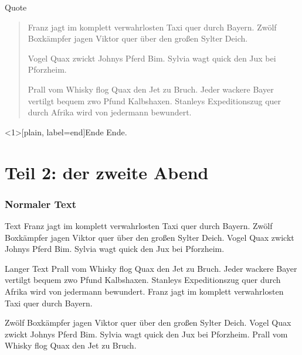 	\begin{frame}{Quote}
		\begin{quote}
			Franz jagt im komplett verwahrlosten Taxi quer durch Bayern.
			Zwölf Boxkämpfer jagen Viktor quer über den großen Sylter Deich.

			Vogel Quax zwickt Johnys Pferd Bim.
			Sylvia wagt quick den Jux bei Pforzheim.

			Prall vom Whisky flog Quax den Jet zu Bruch.
			Jeder wackere Bayer vertilgt bequem zwo Pfund Kalbshaxen.
			Stanleys Expeditionszug quer durch Afrika wird von jedermann bewundert.
		\end{quote}
	\end{frame}

	\begin{frame}[plain, label=end]{Ende}
		\Huge{Ende.}
	\end{frame}








	\part{Teil 2: der zweite Abend}

	\frame{\partpage}

	\section{Normaler Text}

	\begin{frame}{Text}
		Franz jagt im komplett verwahrlosten Taxi quer durch Bayern.
		Zwölf Boxkämpfer jagen Viktor quer über den großen Sylter Deich.
		Vogel Quax zwickt Johnys Pferd Bim.
		Sylvia wagt quick den Jux bei Pforzheim.
	\end{frame}

	\begin{frame}{Langer Text}
		Prall vom Whisky flog Quax den Jet zu Bruch.
		Jeder wackere Bayer vertilgt bequem zwo Pfund Kalbshaxen.
		Stanleys Expeditionszug quer durch Afrika wird von jedermann bewundert.
		Franz jagt im komplett verwahrlosten Taxi quer durch Bayern.

		Zwölf Boxkämpfer jagen Viktor quer über den großen Sylter Deich.
		Vogel Quax zwickt Johnys Pferd Bim.
		Sylvia wagt quick den Jux bei Pforzheim.
		Prall vom Whisky flog Quax den Jet zu Bruch.
	\end{frame}


